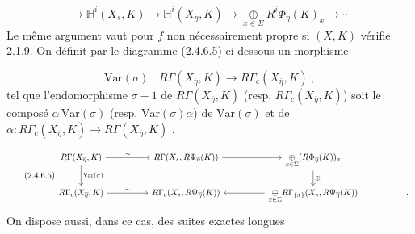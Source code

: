 \begin{equation}\tag{2.4.6.3}
\longrightarrow \mathbb{H}^i(X_s, K) \longrightarrow \mathbb{H}^i(X_{\overline{\eta}}, K) \longrightarrow \underset{x \in \Sigma}{\oplus} R^i\Phi_{\overline{\eta}}(K)_x \longrightarrow \cdots
\end{equation}
Le même argument vaut pour $f$ non nécessairement propre si $(X, K)$ vérifie 2.1.9. On définit par le diagramme (2.4.6.5) ci-dessous un morphisme

\begin{equation}\tag{2.4.6.4}
\mathrm{Var}(\sigma) \ : \ R\Gamma(X_{\overline{\eta}}, K) \longrightarrow R\Gamma_c(X_{\overline{\eta}}, K) \ ,
\end{equation}
tel que l'endomorphisme $\sigma-1$ de $R\Gamma(X_{\overline{\eta}}, K)$ (resp. $R\Gamma_c(X_{\overline{\eta}}, K)$) soit le composé $\alpha \, \mathrm{Var}(\sigma)$ (resp. $\mathrm{Var}(\sigma)\alpha$) de $\mathrm{Var}(\sigma)$ et de $\alpha : R\Gamma_c(X_{\overline{\eta}}, K) \longrightarrow R\Gamma(X_{\overline{\eta}}, K)$ .

\begin{equation}\tag{2.4.6.5}
\begin{tikzcd}[column sep=huge]
R\Gamma (X_{\overline{\eta}} , K) \arrow[r, "\sim"] \arrow[d, "\mathrm{Var}(\sigma)"] & R\Gamma(X_s, R\Psi_{\overline{\eta}}(K)) \arrow[r] & \underset{x \in \Sigma}{\oplus} (R\Phi_{\overline{\eta}}(K))_x \arrow[d, "\oplus"] & {} \\
R\Gamma_c(X_{\overline{\eta}}, K) \arrow[r, "\sim"] & R\Gamma_c(X_s, R\Psi_{\overline{\eta}}(K)) & \underset{x \in \Sigma}{\oplus} R\Gamma_{\{x\}}(X_s,R\Psi_{\overline{\eta}}(K)) \arrow[l] & .
\end{tikzcd}
\end{equation}
On dispose aussi, dans ce cas, des suites exactes longues

